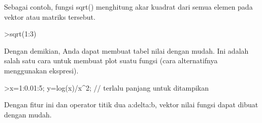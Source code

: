 \documentclass{article}
\newenvironment{eulernotebook}{\par}{\par}
\newenvironment{eulercomment}{\par\medskip}{\par\medskip}
\begin{document}
\begin{eulernotebook}
\begin{eulercomment}
\begin{eulercomment}
\begin{eulercomment}
\begin{eulercomment}
\begin{eulercomment}
\begin{eulercomment}
\begin{eulercomment}
Sebagai contoh, fungsi sqrt() menghitung akar kuadrat dari semua
elemen pada vektor atau matriks tersebut.   
\end{eulercomment}
\begin{eulerprompt}
>sqrt(1:3)
\end{eulerprompt}
\begin{euleroutput}
  [1,  1.41421,  1.73205]
\end{euleroutput}
\begin{eulercomment}
Dengan demikian, Anda dapat membuat tabel nilai dengan mudah. Ini
adalah salah satu cara untuk membuat plot suatu fungsi (cara
alternatifnya menggunakan ekspresi).
\end{eulercomment}
\begin{eulerprompt}
>x=1:0.01:5; y=log(x)/x^2; // terlalu panjang untuk ditampikan
\end{eulerprompt}
\begin{eulercomment}
Dengan fitur ini dan operator titik dua a:delta:b, vektor nilai fungsi
dapat dibuat dengan mudah.


\end{eulercomment}
\end{eulercomment}
\end{eulercomment}
\end{eulercomment}
\end{eulercomment}
\end{eulercomment}
\end{eulercomment}
\end{eulernotebook}
\end{document}
